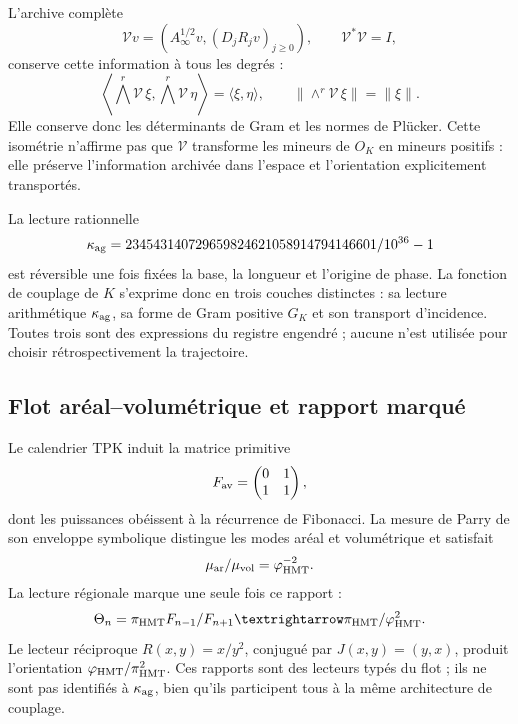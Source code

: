 L’archive complète
\[
 \mathcal Vv=\left(A_\infty^{1/2}v,(D_jR_jv)_{j\ge0}\right),
 \qquad\mathcal V^*\mathcal V=I,
\]
conserve cette information à tous les degrés :
\begin{equation}
 \left\langle\bigwedge^r\mathcal V\,\xi,
 \bigwedge^r\mathcal V\,\eta\right\rangle
 =\langle\xi,\eta\rangle,
 \qquad
 \|\wedge^r\mathcal V\,\xi\|=\|\xi\|.
 \label{geometria_positiva:eq:exterior-isometry}
\end{equation}
Elle conserve donc les déterminants de Gram et les normes de Plücker. Cette isométrie n’affirme pas que \(\mathcal V\) transforme les mineurs de \(O_K\) en mineurs positifs : elle préserve l’information archivée dans l’espace et l’orientation explicitement transportés.

La lecture rationnelle
\[
 \kappa_{\rm ag}=
 \frac{234543140729659824621058914794146601}{10^{36}-1}
\]
est réversible une fois fixées la base, la longueur et l’origine de phase. La fonction de couplage de \(K\) s’exprime donc en trois couches distinctes : sa lecture arithmétique \(\kappa_{\rm ag}\), sa forme de Gram positive \(G_K\) et son transport d’incidence. Toutes trois sont des expressions du registre engendré ; aucune n’est utilisée pour choisir rétrospectivement la trajectoire.

\subsection{Flot aréal--volumétrique et rapport marqué}

Le calendrier TPK induit la matrice primitive
\[
 F_{\rm av}=\begin{pmatrix}0&1\\1&1\end{pmatrix},
\]
dont les puissances obéissent à la récurrence de Fibonacci. La mesure de Parry de son enveloppe symbolique distingue les modes aréal et volumétrique et satisfait
\begin{equation}
 \frac{\mu_{\rm ar}}{\mu_{\rm vol}}=\varphi_{\rm HMT}^{-2}.
 \label{geometria_positiva:eq:area-volume-ratio}
\end{equation}
La lecture régionale marque une seule fois ce rapport :
\begin{equation}
 \Theta_n=\pi_{\rm HMT}\frac{F_{n-1}}{F_{n+1}}
 \longrightarrow\frac{\pi_{\rm HMT}}{\varphi_{\rm HMT}^2}.
 \label{geometria_positiva:eq:marked-area-volume}
\end{equation}
Le lecteur réciproque \(R(x,y)=x/y^2\), conjugué par \(J(x,y)=(y,x)\), produit l’orientation \(\varphi_{\rm HMT}/\pi_{\rm HMT}^2\). Ces rapports sont des lecteurs typés du flot ; ils ne sont pas identifiés à \(\kappa_{\rm ag}\), bien qu’ils participent tous à la même architecture de couplage.

